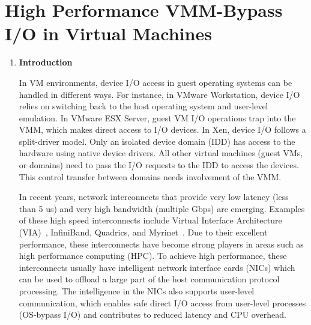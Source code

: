 \documentclass[12pt]{article}
\begin{document}
\section*{High Performance VMM-Bypass I/O in Virtual Machines}
\begin{enumerate}[label*={\fontsize{16pt}{16pt}\selectfont \textbf{\arabic*.}}]
	\item {\fontsize{16pt}{19.2pt}\selectfont \textbf{Introduction}\par}\par

{\fontsize{13pt}{15.6pt}\selectfont In VM environments, device I/O access in guest operating systems can be handled in different ways. For instance, in VMware Workstation, device I/O relies on switching back to the host operating system and user-level emulation. In VMware ESX Server, guest VM I/O operations trap into the VMM, which makes direct access to I/O devices. In Xen, device I/O follows a split-driver model. Only an isolated device domain (IDD) has access to the hardware using native device drivers. All other virtual machines (guest VMs, or domains) need to pass the I/O requests to the IDD to access the devices. This control transfer between domains needs involvement of the VMM.\par}\par

{\fontsize{13pt}{15.6pt}\selectfont In recent years, network interconnects that provide very low latency (less than 5 us) and very high bandwidth (multiple Gbps) are emerging. Examples of these high speed interconnects include Virtual Interface Architecture (VIA) , InfiniBand, Quadrics, and Myrinet . Due to their excellent performance, these interconnects have become strong players in areas such as high performance computing (HPC). To achieve high performance, these interconnects usually have intelligent network interface cards (NICs) which can be used to offload a large part of the host communication protocol processing. The intelligence in the NICs also supports user-level communication, which enables safe direct I/O access from user-level processes (OS-bypass I/O) and contributes to reduced latency and CPU overhead.\par}\par


\end{enumerate}
\end{document}
